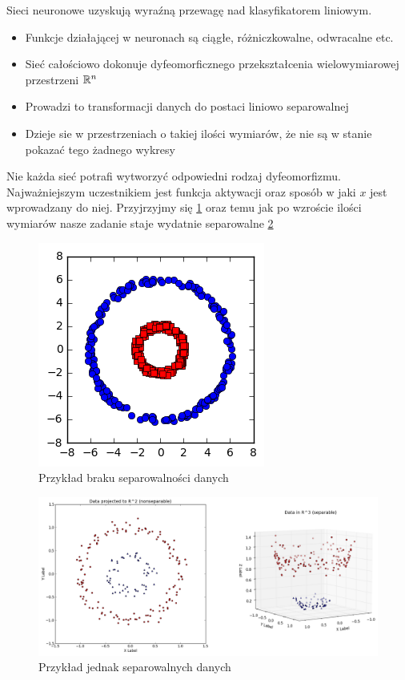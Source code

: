 \documentclass[10pt,a4paper]{book}
\begin{document}
Sieci neuronowe uzyskują wyraźną przewagę nad klasyfikatorem liniowym.
\begin{itemize}
\item Funkcje działającej w neuronach są ciągłe, różniczkowalne, odwracalne etc.
\item Sieć całościowo dokonuje dyfeomorficznego przekształcenia wielowymiarowej przestrzeni $\mathbb{R}^n$
\item Prowadzi to transformacji danych do postaci liniowo separowalnej
\item Dzieje sie w przestrzeniach o takiej ilości wymiarów, że nie są w stanie pokazać tego żadnego wykresy
\end{itemize}

Nie każda sieć potrafi wytworzyć odpowiedni rodzaj dyfeomorfizmu. Najważniejszym uczestnikiem jest funkcja aktywacji oraz sposób w jaki $x$ jest wprowadzany do niej. Przyjrzyjmy się \ref{fig.chapter.predicition.separability.2} oraz temu jak po wzroście ilości wymiarów nasze zadanie staje wydatnie separowalne \ref{fig.chapter.predicition.separability.3}

\begin{figure}
\centering
\includegraphics[scale=0.3]{images/nieseparowalne_dane2.png}
\caption{Przykład braku separowalności danych} \label{fig.chapter.predicition.separability.2}
\end{figure}

\begin{figure}
\centering
\includegraphics[scale=0.15]{images/jednak_separowalne.png}
\caption{Przykład jednak separowalnych danych} \label{fig.chapter.predicition.separability.3}
\end{figure}
\end{document}
